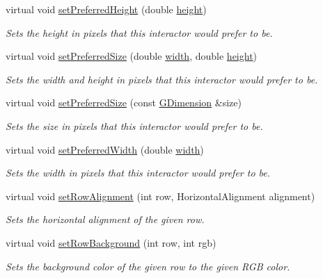 \begin{DoxyCompactItemize}
virtual void \mbox{\hyperlink{classGInteractor_a1ab987704fce32098706c6f00fb08218}{set\+Preferred\+Height}} (double \mbox{\hyperlink{classGTable_ad3774f6419003470f54fd495124ef51f}{height}})
\begin{DoxyCompactList}\small\item\em Sets the height in pixels that this interactor would prefer to be. \end{DoxyCompactList}\item 
virtual void \mbox{\hyperlink{classGInteractor_a042c5ae19430d765ef552371cae3632c}{set\+Preferred\+Size}} (double \mbox{\hyperlink{classGTable_ad72663daf610f2a0833a2fc3d78e4fdf}{width}}, double \mbox{\hyperlink{classGTable_ad3774f6419003470f54fd495124ef51f}{height}})
\begin{DoxyCompactList}\small\item\em Sets the width and height in pixels that this interactor would prefer to be. \end{DoxyCompactList}\item 
virtual void \mbox{\hyperlink{classGInteractor_aa22d9be4bc0e078bb0ea69b0fc9d7c75}{set\+Preferred\+Size}} (const \mbox{\hyperlink{structGDimension}{G\+Dimension}} \&size)
\begin{DoxyCompactList}\small\item\em Sets the size in pixels that this interactor would prefer to be. \end{DoxyCompactList}\item 
virtual void \mbox{\hyperlink{classGInteractor_a3db429ab2fa52efd187eec0ed8cdd9f2}{set\+Preferred\+Width}} (double \mbox{\hyperlink{classGTable_ad72663daf610f2a0833a2fc3d78e4fdf}{width}})
\begin{DoxyCompactList}\small\item\em Sets the width in pixels that this interactor would prefer to be. \end{DoxyCompactList}\item 
virtual void \mbox{\hyperlink{classGTable_ac6a47ba68c502b7d8dc776beeeffccc3}{set\+Row\+Alignment}} (int row, Horizontal\+Alignment alignment)
\begin{DoxyCompactList}\small\item\em Sets the horizontal alignment of the given row. \end{DoxyCompactList}\item 
virtual void \mbox{\hyperlink{classGTable_a85ee577aabd189ed64a5c9f66ba61fd2}{set\+Row\+Background}} (int row, int rgb)
\begin{DoxyCompactList}\small\item\em Sets the background color of the given row to the given R\+GB color. \end{DoxyCompactList}\item 

\end{DoxyCompactItemize}
